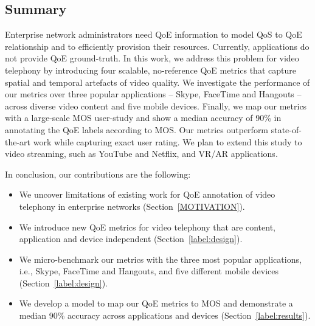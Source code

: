 \subsection{Summary}
Enterprise network administrators need QoE information to model QoS to QoE relationship and to efficiently provision their resources. Currently, applications do not provide QoE ground-truth. In this work, we address this problem for video telephony by introducing four scalable, no-reference QoE metrics that capture spatial and temporal artefacts of video quality. We investigate the performance of our metrics over three popular applications -- Skype, FaceTime and Hangouts -- across diverse video content and five mobile devices. Finally, we map our metrics with a large-scale MOS user-study and show a median accuracy of 90\% in annotating the QoE labels according to MOS. Our metrics outperform state-of-the-art work while capturing exact user rating. We plan to extend this study to video streaming, such as YouTube and Netflix, and VR/AR applications.

In conclusion, our contributions are the following:
\begin{itemize}[leftmargin=*]
    \item We uncover limitations of existing work for QoE annotation of video telephony in enterprise networks (Section~\ref{MOTIVATION}).
    \item We introduce new QoE metrics for video telephony that are content, application and device independent (Section~\ref{label:design}).
    \item We micro-benchmark our metrics with the three most popular applications, i.e., Skype, FaceTime and Hangouts, and five different mobile devices (Section~\ref{label:design}).
    \item We develop a model to map our QoE metrics to MOS and demonstrate a median 90\% accuracy across applications and devices (Section~\ref{label:results}).
\end{itemize}
